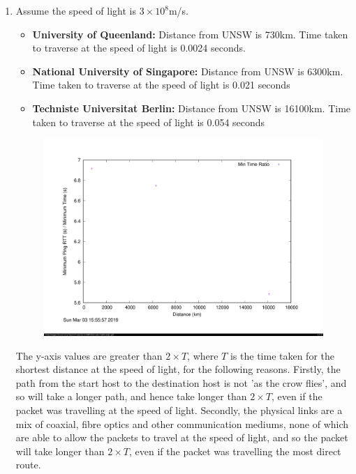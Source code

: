 \documentclass[a4paper,11pt]{article}
\newcommand{\ds}{\displaystyle}
\begin{document}
\begin{enumerate}[leftmargin=*]
	\item Assume the speed of light is $\ds{3\times10^8}$m/s.
		\begin{itemize} 
			\item \textbf{University of Queenland:} Distance from UNSW is 730km. Time taken to traverse at the speed of light is 0.0024 seconds.
			\item \textbf{National University of Singapore:} Distance from UNSW is 6300km. Time taken to traverse at the speed of light is 0.021 seconds
			\item \textbf{Techniste Universitat Berlin:} Distance from UNSW is 16100km. Time taken to traverse at the speed of light is 0.054 seconds
		\end{itemize}

		\begin{figure}[!htb]
		    \centering
		    \begin{minipage}{\textwidth}
		        \centering
		        \includegraphics[width=\linewidth, height=0.5\textheight]{e4q1.png}
		    \end{minipage}
		\end{figure}

		The y-axis values are greater than $\ds{2\times T}$, where $\ds{T}$ is the time taken for the shortest distance at the speed of light, for the following reasons. Firstly, the path from the start host to the destination host is not 'as the crow flies', and so will take a longer path, and hence take longer than $\ds{2\times T}$, even if the packet was travelling at the speed of light. Secondly, the physical links are a mix of coaxial, fibre optics and other communication mediums, none of which are able to allow the packets to travel at the speed of light, and so the packet will take longer than $\ds{2\times T}$, even if the packet was travelling the most direct route.


\end{enumerate}
\end{document}
